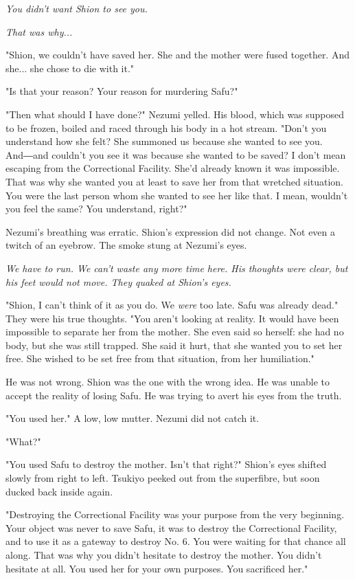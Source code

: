 \emph{You didn't want Shion to see you.}

\emph{That was why...}

"Shion, we couldn't have saved her. She and the mother were fused
together. And she... she chose to die with it."

"Is that your reason? Your reason for murdering Safu?"

"Then what should I have done?" Nezumi yelled. His blood, which was
supposed to be frozen, boiled and raced through his body in a hot
stream. "Don't you understand how she felt? She summoned us because she
wanted to see you. And―and couldn't you see it was because she wanted to
be saved? I don't mean escaping from the Correctional Facility. She'd
already known it was impossible. That was why she wanted you at least to
save her from that wretched situation. You were the last person whom she
wanted to see her like that. I mean, wouldn't you feel the same? You
understand, right?"

Nezumi's breathing was erratic. Shion's expression did not change. Not
even a twitch of an eyebrow. The smoke stung at Nezumi's eyes.

\emph{We have to run. We can't waste any more time here. His thoughts were
clear, but his feet would not move. They quaked at Shion's eyes.}

"Shion, I can't think of it as you do. We \emph{were} too late. Safu was
already dead." They were his true thoughts. "You aren't looking at
reality. It would have been impossible to separate her from the mother.
She even said so herself: she had no body, but she was still trapped.
She said it hurt, that she wanted you to set her free. She wished to be
set free from that situation, from her humiliation."

He was not wrong. Shion was the one with the wrong idea. He was unable
to accept the reality of losing Safu. He was trying to avert his eyes
from the truth.

"You used her." A low, low mutter. Nezumi did not catch it.

"What?"

"You used Safu to destroy the mother. Isn't that right?" Shion's eyes
shifted slowly from right to left. Tsukiyo peeked out from the
superfibre, but soon ducked back inside again.

"Destroying the Correctional Facility was your purpose from the very
beginning. Your object was never to save Safu, it was to destroy the
Correctional Facility, and to use it as a gateway to destroy No. 6. You
were waiting for that chance all along. That was why you didn't hesitate
to destroy the mother. You didn't hesitate at all. You used her for your
own purposes. You sacrificed her."

